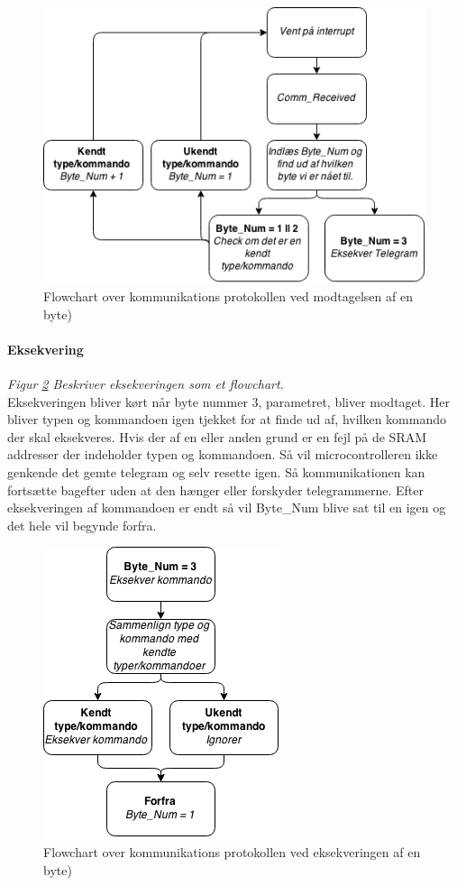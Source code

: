 \begin{figure}[p]

	\centering
		\includegraphics[scale=0.8]{Billeder/Comm_Modtagelse.png}
	\caption{Flowchart over kommunikations protokollen ved modtagelsen af en byte)}
	\label{fig:Comm_Modtagelse}
	
\end{figure}

\paragraph{Eksekvering} 
\textit{Figur \ref{fig:Comm_Eksekvering} Beskriver eksekveringen som et flowchart.} \\
Eksekveringen bliver kørt når byte nummer 3, parametret, bliver modtaget. Her bliver typen og kommandoen igen tjekket for at finde ud af, hvilken kommando der skal eksekveres. Hvis der af en eller anden grund er en fejl på de SRAM addresser der indeholder typen og kommandoen. Så vil microcontrolleren ikke genkende det gemte telegram og selv resette igen. Så kommunikationen kan fortsætte bagefter uden at den hænger eller forskyder telegrammerne. Efter eksekveringen af kommandoen er endt så vil Byte\_Num blive sat til en igen og det hele vil begynde forfra.

\begin{figure}[p]

	\centering
		\includegraphics[scale=0.8]{Billeder/Comm_Eksekvering.png}
	\caption{Flowchart over kommunikations protokollen ved eksekveringen af en byte)}
	\label{fig:Comm_Eksekvering}
	
\end{figure}
